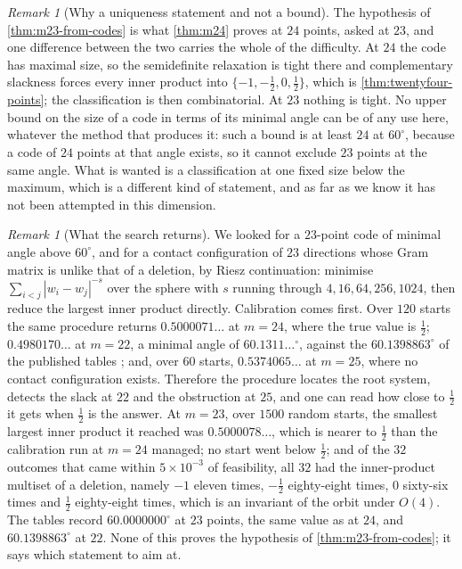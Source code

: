 \documentclass[11pt,reqno]{amsart}
\renewcommand{\_}{\origunderscore\allowbreak}
\numberwithin{equation}{section}
\theoremstyle{plain}
\theoremstyle{definition}
\theoremstyle{remark}
\newtheorem{remark}[thm]{Remark}
\begin{document}
\begin{remark}[Why a uniqueness statement and not a bound]\label{rem:m23-uniqueness}
The hypothesis of \cref{thm:m23-from-codes} is what
\cref{thm:m24} proves at $24$ points, asked at $23$, and one
difference between the two carries the whole of the difficulty. At $24$
the code has maximal size, so the semidefinite relaxation is tight
there and complementary slackness forces every inner product into
$\{-1,-\tfrac12,0,\tfrac12\}$, which is \cref{thm:twentyfour-points};
the classification is then combinatorial. At $23$ nothing is tight. No upper
bound on the size of a code in terms of its minimal angle can be of any
use here, whatever the method that produces it: such a bound is at least
$24$ at $60^\circ$, because a code of $24$ points at that angle exists,
so it cannot exclude $23$ points at the same angle. What is wanted is a
classification at one fixed size below the maximum, which is a different
kind of statement, and as far as we know it has not been attempted in
this dimension.
\end{remark}

\begin{remark}[What the search returns]\label{rem:code-search}
We looked for a $23$-point code of minimal angle above $60^\circ$, and
for a contact configuration of $23$ directions whose Gram matrix is
unlike that of a deletion, by Riesz continuation: minimise
$\sum_{i<j}|w_i-w_j|^{-s}$ over the sphere with $s$ running through
$4,16,64,256,1024$, then reduce the largest inner product directly.
Calibration comes first. Over $120$ starts the same procedure returns
$0.5000071\ldots$ at $m=24$, where the true value is $\tfrac12$;
$0.4980170\ldots$ at $m=22$, a minimal angle of $60.1311\ldots^\circ$,
against the $60.1398863^\circ$ of the published tables \cite{Slo}; and,
over $60$ starts, $0.5374065\ldots$ at $m=25$, where no contact
configuration exists. Therefore the procedure locates the root system,
detects the slack at $22$ and the obstruction at $25$, and one can read how
close to $\tfrac12$ it gets when $\tfrac12$ is the answer. At $m=23$,
over $1500$ random starts, the smallest largest inner product it reached
was $0.5000078\ldots$, which is nearer to $\tfrac12$ than the calibration
run at $m=24$ managed; no start went below $\tfrac12$; and of the $32$
outcomes that came within $5\times10^{-3}$ of feasibility, all $32$ had
the inner-product multiset of a deletion, namely $-1$ eleven times,
$-\tfrac12$ eighty-eight times, $0$ sixty-six times and $\tfrac12$
eighty-eight times, which is an invariant of the orbit under $O(4)$.
The tables \cite{Slo} record $60.0000000^\circ$ at $23$ points, the same
value as at $24$, and $60.1398863^\circ$ at $22$. None of this proves
the hypothesis of \cref{thm:m23-from-codes}; it says which statement
to aim at.
\end{remark}
\end{document}
